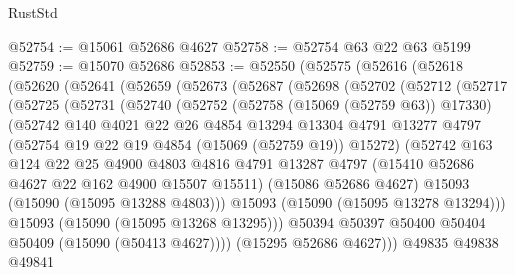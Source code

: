 \begin{lexlean}{RustStd}
\begin{coremodule}
@52754 := @15061 @52686 @4627
@52758 := @52754 @63 @22 @63 @5199
@52759 := @15070 @52686
@52853 := @52550
    (@52575
      (@52616
        (@52618
          (@52620
            (@52641
              (@52659
                (@52673
                  (@52687
                    (@52698
                      (@52702
                        (@52712
                          (@52717
                            (@52725
                              (@52731
                                (@52740
                                  (@52752
                                    (@52758 (@15069 (@52759 @63)) @17330)
                                    (@52742
                                      @140
                                      @4021
                                      @22
                                      @26
                                      @4854
                                      @13294
                                      @13304
                                      @4791
                                      @13277
                                      @4797
                                      (@52754 @19 @22 @19 @4854 (@15069 (@52759 @19)) @15272)
                                      (@52742
                                        @163
                                        @124
                                        @22
                                        @25
                                        @4900
                                        @4803
                                        @4816
                                        @4791
                                        @13287
                                        @4797
                                        (@15410 @52686 @4627 @22 @162 @4900 @15507 @15511)
                                        (@15086 @52686 @4627)
                                        @15093
                                        (@15090 (@15095 @13288 @4803)))
                                      @15093
                                      (@15090 (@15095 @13278 @13294)))
                                    @15093
                                    (@15090 (@15095 @13268 @13295)))
                                  @50394
                                  @50397
                                  @50400
                                  @50404
                                  @50409
                                  (@15090 (@50413 @4627))))
                              (@15295 @52686 @4627)))
                          @49835
                          @49838
                          @49841

\end{coremodule}
\end{lexlean}
